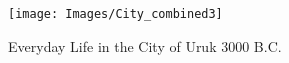 \documentclass[graybox]{svmult}
\begin{document}

\begin{figure}
\begin{center}
  \texttt{[image: Images/City\_combined3]}
  \caption{ Everyday Life in the City of Uruk  3000 B.C.}
  \label{fig:execution}
\end{center}
\end{figure}
\end{document}
